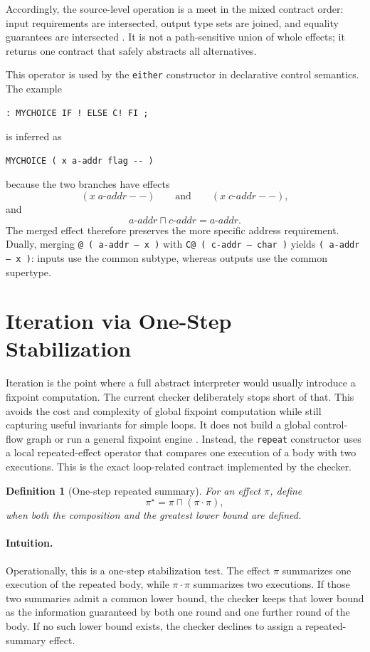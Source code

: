 \documentclass[acmsmall,screen,review,anonymous,nonacm]{acmart}
\newtheorem{definition}{Definition}
\newcommand{\glb}{\mathbin{\sqcap}}
\newcommand{\compose}{\mathbin{\cdot}}
\begin{document}
Accordingly, the source-level operation is a meet in the mixed contract order: input
requirements are intersected, output type sets are joined, and equality guarantees are
intersected \cite{poial2006typing}. It is not a path-sensitive union of whole effects; it
returns one contract that safely abstracts all alternatives.

This operator is used by the \texttt{either} constructor in declarative control semantics. The example
\begin{lstlisting}
: MYCHOICE IF ! ELSE C! FI ;
\end{lstlisting}
is inferred as
\begin{lstlisting}
MYCHOICE ( x a-addr flag -- )
\end{lstlisting}
because the two branches have effects
\[
(x\;a\text{-}addr -- )
\qquad\text{and}\qquad
(x\;c\text{-}addr -- ),
\]
and
\[
a\text{-}addr \glb c\text{-}addr = a\text{-}addr.
\]
The merged effect therefore preserves the more specific address requirement. Dually,
merging \texttt{@ ( a-addr -- x )} with \texttt{C@ ( c-addr -- char )}
yields \texttt{( a-addr -- x )}: inputs use the common subtype, whereas outputs
use the common supertype.

\section{Iteration via One-Step Stabilization}
Iteration is the point where a full abstract interpreter would usually introduce a
fixpoint computation. The current checker deliberately stops short of that. This avoids
the cost and complexity of global fixpoint computation while still capturing useful
invariants for simple loops. It does not build a global control-flow graph or run a
general fixpoint engine
\cite{cousot1977abstract}. Instead, the \texttt{repeat} constructor uses a local
repeated-effect operator that compares one execution of a body with two executions. This
is the exact loop-related contract implemented by the checker.

\begin{definition}[One-step repeated summary]
For an effect $\pi$, define
\[
\pi^\star = \pi \glb (\pi \compose \pi),
\]
when both the composition and the greatest lower bound are defined.
\end{definition}

\paragraph{Intuition.}
Operationally, this is a one-step stabilization test. The effect $\pi$ summarizes one
execution of the repeated body, while $\pi \compose \pi$ summarizes two executions. If
those two summaries admit a common lower bound, the checker keeps that lower bound as the
information guaranteed by both one round and one further round of the body. If no such
lower bound exists, the checker declines to assign a repeated-summary effect.
\end{document}

